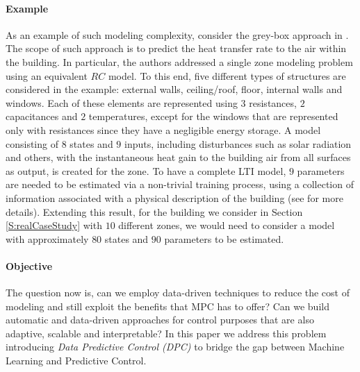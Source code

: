 
\paragraph{Example} As an example of such modeling complexity, consider the grey-box approach in \cite{Braun2002}. The scope of such approach is to predict the heat transfer rate to the air within the building. In particular, the authors addressed a single zone modeling problem using an equivalent $RC$ model. To this end, five different types of structures are considered in the example: external walls, ceiling/roof, floor, internal walls and windows. Each of these elements are represented using $3$ resistances, $2$ capacitances and $2$ temperatures, except for the windows that are represented only with resistances since they have a negligible energy storage. A model consisting of $8$ states and $9$ inputs, including disturbances such as solar radiation and others, with the instantaneous heat gain to the building air from all surfaces as output, is created for the zone. To have a complete LTI model, $9$ parameters are needed to be estimated via a non-trivial training process, using a collection of information associated with a physical description of the building (see \cite{Braun2002} for more details). Extending this result, for the building we consider in Section \ref{S:realCaseStudy} with $10$ different zones, we would need to consider a model with approximately $80$ states and $90$ parameters to be estimated.

	
\paragraph{Objective} The question now is, can we employ data-driven techniques to reduce the cost of modeling and still exploit the benefits that MPC has to offer? Can we build automatic and data-driven approaches for control purposes that are also adaptive, scalable and interpretable? In this paper we address this problem introducing \textit{Data Predictive Control (DPC)} to bridge the gap between Machine Learning and Predictive Control.

